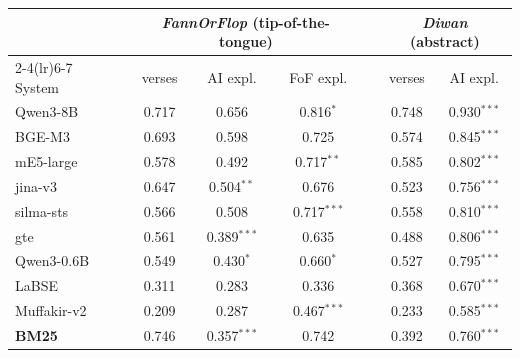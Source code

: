 \begin{tabular}{l ccc c cc}
\toprule
& \multicolumn{3}{c}{\textit{FannOrFlop} (tip-of-the-tongue)} & & \multicolumn{2}{c}{\textit{Diwan} (abstract)} \\
\cmidrule(lr){2-4}\cmidrule(lr){6-7}
System & verses & AI expl. & FoF expl. & & verses & AI expl. \\
\midrule
Qwen3-8B & 0.717 & 0.656 & 0.816$^{*}$ & & 0.748 & 0.930$^{***}$ \\
BGE-M3 & 0.693 & 0.598 & 0.725 & & 0.574 & 0.845$^{***}$ \\
mE5-large & 0.578 & 0.492 & 0.717$^{**}$ & & 0.585 & 0.802$^{***}$ \\
jina-v3 & 0.647 & 0.504$^{**}$ & 0.676 & & 0.523 & 0.756$^{***}$ \\
silma-sts & 0.566 & 0.508 & 0.717$^{***}$ & & 0.558 & 0.810$^{***}$ \\
gte & 0.561 & 0.389$^{***}$ & 0.635 & & 0.488 & 0.806$^{***}$ \\
Qwen3-0.6B & 0.549 & 0.430$^{*}$ & 0.660$^{*}$ & & 0.527 & 0.795$^{***}$ \\
LaBSE & 0.311 & 0.283 & 0.336 & & 0.368 & 0.670$^{***}$ \\
Muffakir-v2 & 0.209 & 0.287 & 0.467$^{***}$ & & 0.233 & 0.585$^{***}$ \\
\midrule
\textbf{BM25} & 0.746 & 0.357$^{***}$ & 0.742 & & 0.392 & 0.760$^{***}$ \\
\bottomrule
\end{tabular}